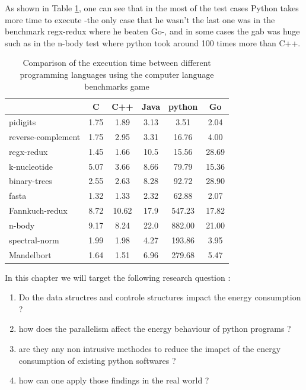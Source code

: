As shown in Table \ref{fig:clbg}, one can see that in the most of the test cases Python takes more time to execute -the only case that he wasn't the last one was in the benchmark regx-redux where he beaten Go-, and in some cases the gab was huge such as in the n-body test where python took around 100 times more than C++.

\begin{table}[hbt]
    \begin{tabular}{l|*{5}c}
                           & C    & C++   & Java & python & Go    \\
        \hline
        pidigits           & 1.75 & 1.89  & 3.13 & 3.51   & 2.04  \\
        reverse-complement & 1.75 & 2.95  & 3.31 & 16.76  & 4.00  \\
        regx-redux         & 1.45 & 1.66  & 10.5 & 15.56  & 28.69 \\
        k-nucleotide       & 5.07 & 3.66  & 8.66 & 79.79  & 15.36 \\
        binary-trees       & 2.55 & 2.63  & 8.28 & 92.72  & 28.90 \\
        fasta              & 1.32 & 1.33  & 2.32 & 62.88  & 2.07  \\
        Fannkuch-redux     & 8.72 & 10.62 & 17.9 & 547.23 & 17.82 \\
        n-body             & 9.17 & 8.24  & 22.0 & 882.00 & 21.00 \\
        spectral-norm      & 1.99 & 1.98  & 4.27 & 193.86 & 3.95  \\
        Mandelbort         & 1.64 & 1.51  & 6.96 & 279.68 & 5.47
    \end{tabular}
    \caption{Comparison of the execution time between different programming languages using the computer language benchmarks game \cite{noauthor_which_nodate}}
    \label{fig:clbg}
\end{table}

In this chapter we will target the following research question :
\begin{enumerate}
    \item Do the data structres and controle structures impact the energy consumption ?
    \item how does the parallelism affect the energy behaviour of python programs ?
    \item are they any non intrusive methodes to reduce the imapct of the energy consumption of existing python softwares ?
    \item how can one apply those findings in the real world ?
\end{enumerate}

